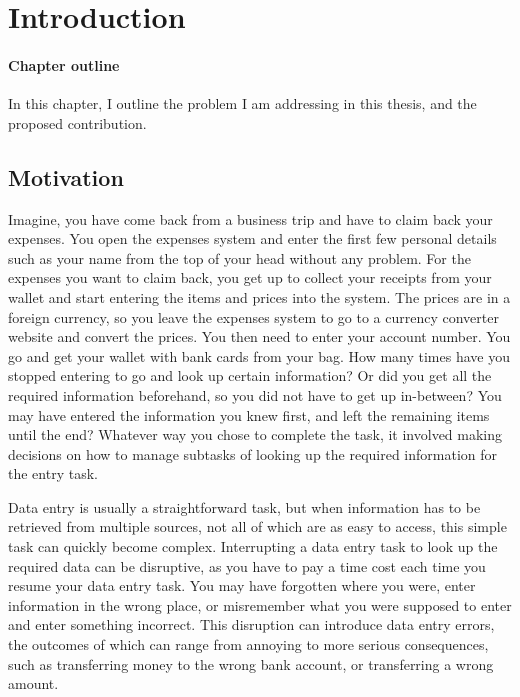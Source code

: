 \chapter{Introduction}

\begin{mynote}
\subsubsection{Chapter outline}
In this chapter, I outline the problem I am addressing in this thesis, and the proposed contribution.
\end{mynote}

\vspace{10pt}

\section{Motivation}
Imagine, you have come back from a business trip and have to claim back your expenses. You open the expenses system and enter the first few personal details such as your name from the top of your head without any problem. For the expenses you want to claim back, you get up to collect your receipts from your wallet and start entering the items and prices into the system. The prices are in a foreign currency, so you leave the expenses system to go to a currency converter website and convert the prices. You then need to enter your account number. You go and get your wallet with bank cards from your bag. How many times have you stopped entering to go and look up certain information? Or did you get all the required information beforehand, so you did not have to get up in-between? You may have entered the information you knew first, and left the remaining items until the end? Whatever way you chose to complete the task, it involved making decisions on how to manage subtasks of looking up the required information for the entry task. 

Data entry is usually a straightforward task, but when information has to be retrieved from multiple sources, not all of which are as easy to access, this simple task can quickly become complex. Interrupting a data entry task to look up the required data can be disruptive, as you have to pay a time cost 
each time you resume your data entry task. You may have forgotten where you were, enter information in the wrong place, or misremember what you were supposed to enter and enter something incorrect. This disruption can introduce data entry errors, the outcomes of which can range from annoying to more serious consequences, such as transferring money to the wrong bank account, or transferring a wrong amount.  

